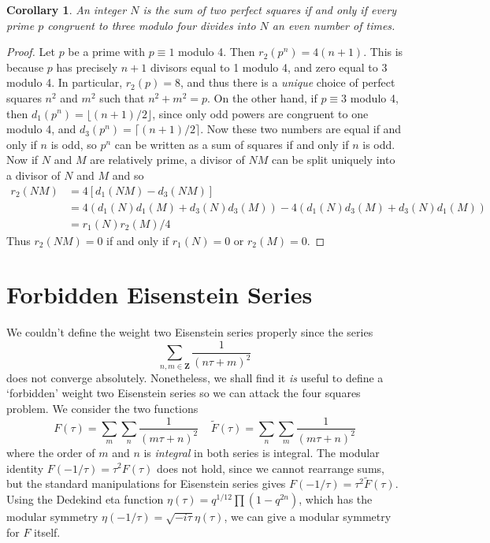 \documentclass{article}
\theoremstyle{plain}
\newtheorem{corollary}[theorem]{Corollary}
\theoremstyle{remark}
\theoremstyle{definition}
\begin{document}
\begin{corollary}
    An integer $N$ is the sum of two perfect squares if and only if every prime $p$ congruent to three modulo four divides into $N$ an even number of times.
\end{corollary}
\begin{proof}
    Let $p$ be a prime with $p \equiv 1$ modulo 4. Then $r_2(p^n) = 4(n+1)$. This is because $p$ has precisely $n+1$ divisors equal to 1 modulo 4, and zero equal to 3 modulo 4. In particular, $r_2(p) = 8$, and thus there is a {\it unique} choice of perfect squares $n^2$ and $m^2$ such that $n^2 + m^2 = p$. On the other hand, if $p \equiv 3$ modulo 4, then $d_1(p^n) = \lfloor (n+1)/2 \rfloor$, since only odd powers are congruent to one modulo 4, and $d_3(p^n) = \lceil (n+1)/2 \rceil$. Now these two numbers are equal if and only if $n$ is odd, so $p^n$ can be written as a sum of squares if and only if $n$ is odd. Now if $N$ and $M$ are relatively prime, a divisor of $NM$ can be split uniquely into a divisor of $N$ and $M$ and so
    \begin{align*}
        r_2(NM) &= 4[d_1(NM) - d_3(NM)]\\
        &= 4(d_1(N) d_1(M) + d_3(N) d_3(M)) - 4(d_1(N) d_3(M) + d_3(N) d_1(M))\\
        &= r_1(N)r_2(M)/4
    \end{align*}
    Thus $r_2(NM) = 0$ if and only if $r_1(N) = 0$ or $r_2(M) = 0$.
\end{proof}

\section{Forbidden Eisenstein Series}

We couldn't define the weight two Eisenstein series properly since the series
%
\[ \sum_{n,m \in \mathbf{Z}} \frac{1}{(n\tau + m)^2} \]
%
does not converge absolutely. Nonetheless, we shall find it {\it is} useful to define a `forbidden' weight two Eisenstein series so we can attack the four squares problem. We consider the two functions
%
\[ F(\tau) = \sum_m \sum_n \frac{1}{(m\tau + n)^2}\ \ \ \ \ \tilde{F}(\tau) = \sum_n \sum_m \frac{1}{(m\tau + n)^2} \]
%
where the order of $m$ and $n$ is {\it integral} in both series is integral. The modular identity $F(-1/\tau) = \tau^2 F(\tau)$ does not hold, since we cannot rearrange sums, but the standard manipulations for Eisenstein series gives $F(-1/\tau) = \tau^2 \tilde{F}(\tau)$. Using the Dedekind eta function $\eta(\tau) = q^{1/12} \prod (1 - q^{2n})$, which has the modular symmetry $\eta(-1/\tau) = \sqrt{-i \tau} \eta(\tau)$, we can give a modular symmetry for $F$ itself.
\end{document}
